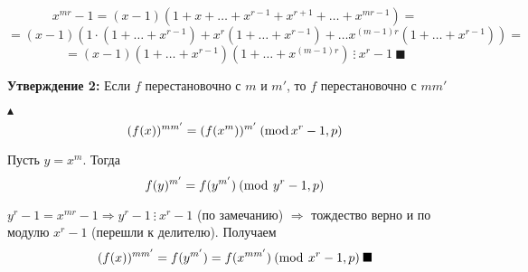 $$x^{mr}-1=(x-1)(1+x+\ldots+x^{r-1}+x^{r+1}+\ldots+x^{mr-1})=$$$$=(x-1)(1 \cdot (1+\ldots+x^{r-1})+x^r (1+\ldots+x^{r-1})+\ldots x^{(m-1)r}(1+\ldots+x^{r-1}))=$$$$=(x-1)(1+\ldots+x^{r-1})(1+\ldots+x^{(m-1)r}) \: \vdots \: x^r-1 \: \blacksquare$$
\par \textbf{Утверждение 2:} Если $f$ перестановочно с $m$ и $m'$, то $f$ перестановочно с $mm'$
\par $\blacktriangle$ $$(f(x))^{mm'}=(f(x^m))^{m'} \: (\operatorname{mod} x^r-1, p)$$
\par Пусть $y=x^m$. Тогда
$$f(y)^{m'}=f(y^{m'}) \: (\operatorname{mod} \: y^r-1, p)$$
\par $y^r-1=x^{mr}-1 \Rightarrow y^r-1 \: \vdots \: x^r-1$ (по замечанию) $\Rightarrow$ тождество верно и по модулю $x^r-1$ (перешли к делителю). Получаем
$$(f(x))^{mm'}=f(y^{m'})=f(x^{mm'}) \: (\operatorname{mod} \: x^r-1, p) \: \blacksquare$$
